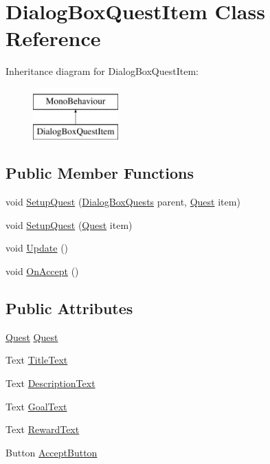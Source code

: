 \hypertarget{class_dialog_box_quest_item}{}\section{Dialog\+Box\+Quest\+Item Class Reference}
\label{class_dialog_box_quest_item}
Inheritance diagram for Dialog\+Box\+Quest\+Item\+:\begin{figure}[H]
\begin{center}
\leavevmode
\includegraphics[height=2.000000cm]{class_dialog_box_quest_item}
\end{center}
\end{figure}
\subsection*{Public Member Functions}
\begin{DoxyCompactItemize}
\item 
void \hyperlink{class_dialog_box_quest_item_ae5ad7b66d4a6f3052912ff3248a450ce}{Setup\+Quest} (\hyperlink{class_dialog_box_quests}{Dialog\+Box\+Quests} parent, \hyperlink{class_quest}{Quest} item)
\item 
void \hyperlink{class_dialog_box_quest_item_acccb4dacec78300b8ae551dc3c65e5a9}{Setup\+Quest} (\hyperlink{class_quest}{Quest} item)
\item 
void \hyperlink{class_dialog_box_quest_item_a571d143d2ddc4b03f1b3f5d390c9e8c7}{Update} ()
\item 
void \hyperlink{class_dialog_box_quest_item_ad70c4f8dc0e51a6d8b1b291e4ac79ebc}{On\+Accept} ()
\end{DoxyCompactItemize}
\subsection*{Public Attributes}
\begin{DoxyCompactItemize}
\item 
\hyperlink{class_quest}{Quest} \hyperlink{class_dialog_box_quest_item_a9fda5b5e17f9572002dea73ac3ba34aa}{Quest}
\item 
Text \hyperlink{class_dialog_box_quest_item_a58803a9f62c3b14a36d7bca70f77df28}{Title\+Text}
\item 
Text \hyperlink{class_dialog_box_quest_item_a60826d92398b541df5e53f951169c95e}{Description\+Text}
\item 
Text \hyperlink{class_dialog_box_quest_item_af482a9da0214330ae229397a2fc564f7}{Goal\+Text}
\item 
Text \hyperlink{class_dialog_box_quest_item_ace55d1de24051ef1e5212458b0019466}{Reward\+Text}
\item 
Button \hyperlink{class_dialog_box_quest_item_aedca6579cbb47ffb6f3e9aa7d18de9bb}{Accept\+Button}
\end{DoxyCompactItemize}


